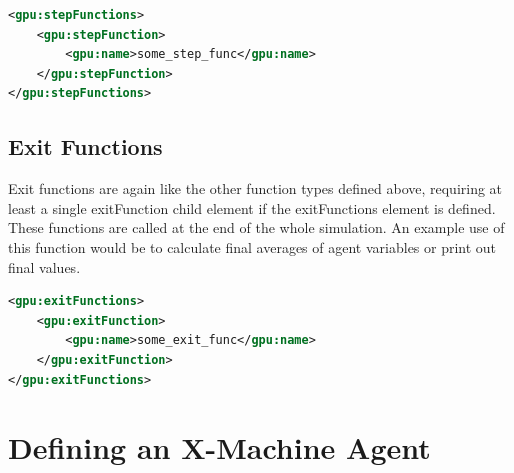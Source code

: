 \documentclass[11pt, a4paper, onecolumn, oneside]{report}
\begin{document}
\begin{lstlisting}[language=XML]
<gpu:stepFunctions>
    <gpu:stepFunction>
        <gpu:name>some_step_func</gpu:name>
    </gpu:stepFunction>
</gpu:stepFunctions>
\end{lstlisting}

\subsection{Exit Functions}
\label{sec:exitFunc}

Exit functions are again like the other function types defined above, requiring at least a single exitFunction child element if the exitFunctions element is defined. These functions are called at the end of the whole simulation. An example use of this function would be to calculate final averages of agent variables or print out final values.

\begin{lstlisting}[language=XML]
<gpu:exitFunctions>
    <gpu:exitFunction>
        <gpu:name>some_exit_func</gpu:name>
    </gpu:exitFunction>
</gpu:exitFunctions>
\end{lstlisting}


\section{Defining an X-Machine Agent}
\label{sec:23}
\end{document}
